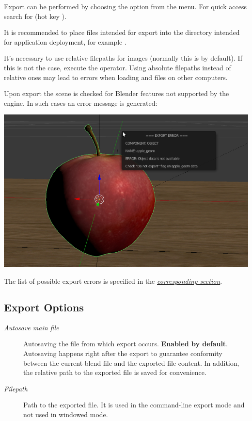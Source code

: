 \documentclass[a4paper,12pt,oneside]{sphinxmanual}
\begin{document}
Export can be performed by choosing the  option from the  menu. For quick access search for  (hot key ).

It is recommended to place files intended for export into the directory intended for application deployment, for example .

It's necessary to use relative filepaths for images (normally this is by default). If this is not the case, execute the  operator. Using absolute filepaths instead of relative ones may lead to errors when loading  and  files on other computers.

Upon export the scene is checked for Blender features not supported by the engine. In such cases an error message is generated:

{\hfill\includegraphics[width=1.000\linewidth]{error_message.jpg}\hfill}

\begin{DUlineblock}{0em}
\item[] 
\end{DUlineblock}

The list of possible export errors is specified in the {\hyperref[addon:export-errors]{\emph{corresponding section}}}.


\subsection{Export Options}
\label{workflow:id4}\begin{description}
\item[{\emph{Autosave main file}}] \leavevmode
Autosaving the file from which export occurs. \textbf{Enabled by default}. Autosaving happens right after the export to guarantee conformity between the current blend-file and the exported file content. In addition, the relative path to the exported file is saved for convenience.

\item[{\emph{Filepath}}] \leavevmode
Path to the exported file. It is used in the command-line export mode and not used in windowed mode.

\end{description}
\end{document}
